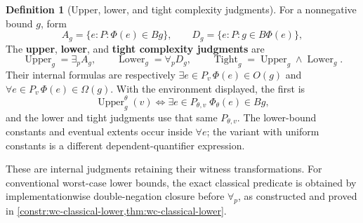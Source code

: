 \documentclass[11pt,a4paper]{article}
\numberwithin{algorithm}{section}
\numberwithin{equation}{section}
\theoremstyle{definition}
\newtheorem{definition}[definition]{Definition}
\theoremstyle{remark}
\theoremstyle{plain}
\theoremstyle{definition}
\theoremstyle{plain}
\begin{document}
\begin{definition}[Upper, lower, and tight complexity judgments]\label{def:complexity-judgments}
For a nonnegative bound $g$, form
\[
 A_g=\{e:P:\Phi(e)\in Bg\},\qquad
 D_g=\{e:P:g\in B\Phi(e)\},
\]
The \textbf{upper}, \textbf{lower}, and \textbf{tight complexity judgments} are
\begin{equation}\label{eq:complexity-adjoints}
 \operatorname{Upper}_g=\exists_pA_g,\qquad
 \operatorname{Lower}_g=\forall_pD_g,\qquad
 \operatorname{Tight}_g=\operatorname{Upper}_g\wedge
                       \operatorname{Lower}_g.
\end{equation}
Their internal formulas are respectively
$\exists e\in P_v\,\Phi(e)\in O(g)$ and
$\forall e\in P_v\,\Phi(e)\in\Omega(g)$.
With the environment displayed, the first is
\[
 \operatorname{Upper}^{\theta}_g(v)
 \iff\exists e\in P_{\theta,v}\;\Phi_\theta(e)\in Bg,
\]
and the lower and tight judgments use that same $P_{\theta,v}$.
The lower-bound constants and eventual extents occur inside
$\forall e$; the variant with uniform constants is a different
dependent-quantifier expression.
\end{definition}

These are internal judgments retaining their witness transformations.
For conventional worst-case lower bounds, the exact classical
predicate is obtained by implementationwise double-negation closure
before $\forall_p$, as constructed and proved in
\cref{constr:wc-classical-lower,thm:wc-classical-lower}.
\end{document}
